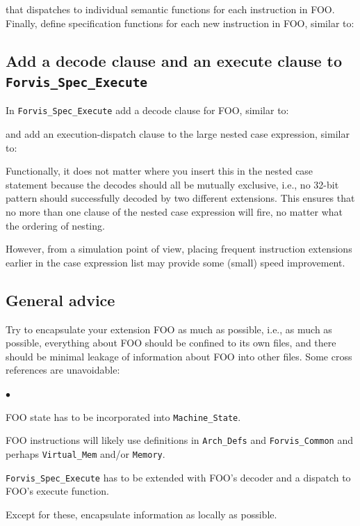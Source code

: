 \documentclass[11pt]{article}
\newenvironment{tightlist}%
{\begin{list}{$\bullet$}{%
    \setlength{\topsep}{0in}
    \setlength{\partopsep}{0in}
    \setlength{\itemsep}{0in}
    \setlength{\parsep}{0in}
    \setlength{\leftmargin}{1.5em}
    \setlength{\rightmargin}{0in}
    \setlength{\itemindent}{0in}
}
}%
{\end{list}
}
\begin{document}


that dispatches to individual semantic functions for each instruction
in FOO.  Finally, define specification functions for each new
instruction in FOO, similar to:




\subsection{Add a decode clause and an execute clause to {\tt Forvis\_Spec\_Execute}}

In \verb|Forvis_Spec_Execute| add a decode clause for FOO, similar to:



and add an execution-dispatch clause to the large nested case
expression, similar to:



Functionally, it does not matter where you insert this in the nested
case statement because the decodes should all be mutually exclusive,
i.e., no 32-bit pattern should successfully decoded by two different
extensions.  This ensures that no more than one clause of the nested
case expression will fire, no matter what the ordering of nesting.

However, from a simulation point of view, placing frequent instruction
extensions earlier in the case expression list may provide some
(small) speed improvement.



\subsection{General advice}

Try to encapsulate your extension FOO as much as possible, i.e., as
much as possible, everything about FOO should be confined to its own
files, and there should be minimal leakage of information about FOO
into other files.  Some cross references are unavoidable:

\begin{tightlist}

\item FOO state has to be incorporated into \verb|Machine_State|.

\item FOO instructions will likely use definitions in \verb|Arch_Defs|
and \verb|Forvis_Common| and perhaps \verb|Virtual_Mem| and/or
\verb|Memory|.

\item \verb|Forvis_Spec_Execute| has to be extended with FOO's decoder
and a dispatch to FOO's execute function.

\end{tightlist}
Except for these, encapsulate information as locally as possible.
\end{document}
